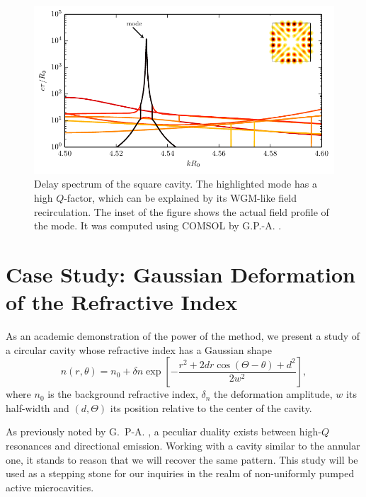\begin{figure}
 \centering
 \includegraphics{figs/passive/spectrum_square_inset.pdf}
 \caption[Delay spectrum of the square cavity]
	 {Delay spectrum of the square cavity. The highlighted mode 
	 has a high $Q$-factor, which can be explained by its 
	 WGM-like field recirculation. The inset of the figure shows
	 the actual field profile of the mode. It was computed 
	 using COMSOL by G.P.-A. \cite{GAP2013a}.}
 \label{fig:passive.numerical.squareSpectrum}
\end{figure}

\section{Case Study: Gaussian Deformation of the Refractive Index}
As an academic demonstration of the power of the method, 
we present a study of a circular cavity whose refractive index
has a Gaussian shape
  \begin{equation}
   n(r,\theta) = n_0 + \delta n\exp\left[-\frac{r^2+2dr\cos\left(\Theta-\theta\right)+d^2}{2w^2}\right],
  \end{equation}
where $n_0$ is the background refractive index, $\delta _n$ the 
deformation amplitude, $w$ its half-width and $(d,\Theta)$
its position relative to the center of the cavity. 

As previously noted by G.~P-A. \cite{GAP2013a}, a peculiar
duality exists between high-$Q$ resonances and directional emission.
Working with a cavity similar to the annular one, it stands to reason
that we will recover the same pattern. This study will be used
as a stepping stone for our inquiries in the realm of non-uniformly
pumped active microcavities. 

